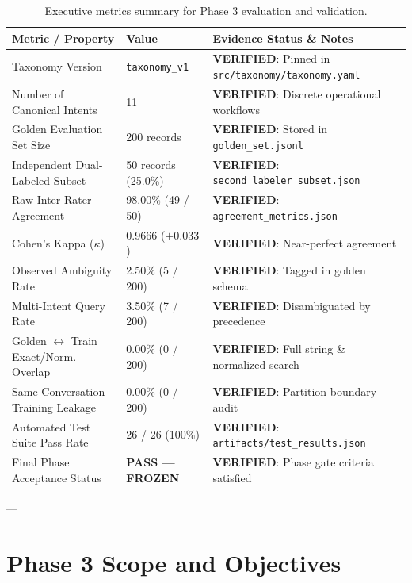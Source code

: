 \documentclass[11pt,a4paper]{article}
\begin{document}
\begin{table}[ht]
\centering
\small
\begin{tabular}{llp{7cm}}
\toprule
\textbf{Metric / Property} & \textbf{Value} & \textbf{Evidence Status \& Notes} \\
\midrule
Taxonomy Version & \texttt{taxonomy\_v1} & \textbf{VERIFIED}: Pinned in \texttt{src/taxonomy/taxonomy.yaml} \\
Number of Canonical Intents & 11 & \textbf{VERIFIED}: Discrete operational workflows \\
Golden Evaluation Set Size & 200 records & \textbf{VERIFIED}: Stored in \texttt{golden\_set.jsonl} \\
Independent Dual-Labeled Subset & 50 records (25.0\%) & \textbf{VERIFIED}: \texttt{second\_labeler\_subset.json} \\
Raw Inter-Rater Agreement & 98.00\% (49 / 50) & \textbf{VERIFIED}: \texttt{agreement\_metrics.json} \\
Cohen's Kappa ($\kappa$) & 0.9666 ($\pm 0.033$) & \textbf{VERIFIED}: Near-perfect agreement \\
Observed Ambiguity Rate & 2.50\% (5 / 200) & \textbf{VERIFIED}: Tagged in golden schema \\
Multi-Intent Query Rate & 3.50\% (7 / 200) & \textbf{VERIFIED}: Disambiguated by precedence \\
Golden $\leftrightarrow$ Train Exact/Norm. Overlap & 0.00\% (0 / 200) & \textbf{VERIFIED}: Full string \& normalized search \\
Same-Conversation Training Leakage & 0.00\% (0 / 200) & \textbf{VERIFIED}: Partition boundary audit \\
Automated Test Suite Pass Rate & 26 / 26 (100\%) & \textbf{VERIFIED}: \texttt{artifacts/test\_results.json} \\
Final Phase Acceptance Status & \textbf{PASS --- FROZEN} & \textbf{VERIFIED}: Phase gate criteria satisfied \\
\bottomrule
\end{tabular}
\caption{Executive metrics summary for Phase 3 evaluation and validation.}
\label{tab:exec_summary}
\end{table}

---

\section{Phase 3 Scope and Objectives}
\end{document}

